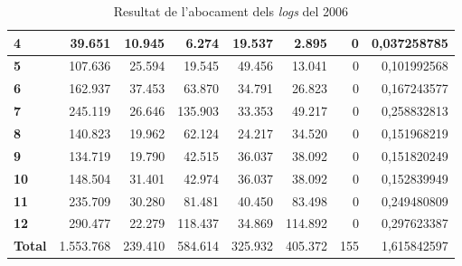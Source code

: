 \begin{table}[h!]
\begin{adjustbox}{width=1.2\textwidth, center}
\begin{tabular}{|l|r|r|r|r|r|r|r|}
            \textbf{4}     & 39.651       & 10.945     & 6.274      & 19.537     & 2.895      & 0            & 0,037258785          \\
            \midrule
            \textbf{5}     & 107.636      & 25.594     & 19.545     & 49.456     & 13.041     & 0            & 0,101992568          \\
            \textbf{6}     & 162.937      & 37.453     & 63.870     & 34.791     & 26.823     & 0            & 0,167243577          \\
            \textbf{7}     & 245.119      & 26.646     & 135.903    & 33.353     & 49.217     & 0            & 0,258832813          \\
            \textbf{8}     & 140.823      & 19.962     & 62.124     & 24.217     & 34.520     & 0            & 0,151968219          \\
            \midrule
            \textbf{9}     & 134.719      & 19.790     & 42.515     & 36.037     & 38.092     & 0            & 0,151820249          \\
            \textbf{10}    & 148.504      & 31.401     & 42.974     & 36.037     & 38.092     & 0            & 0,152839949          \\
            \textbf{11}    & 235.709      & 30.280     & 81.481     & 40.450     & 83.498     & 0            & 0,249480809          \\
            \textbf{12}    & 290.477      & 22.279     & 118.437    & 34.869     & 114.892    & 0            & 0,297623387          \\
            \midrule
            \textbf{Total} & 1.553.768    & 239.410    & 584.614    & 325.932    & 405.372    & 155          & 1,615842597          \\
            \bottomrule
        \end{tabular}
    \end{adjustbox}
    \caption{Resultat de l'abocament dels \textit{logs} del 2006}
    \label{tab:logs-table-2006}
\end{table}

